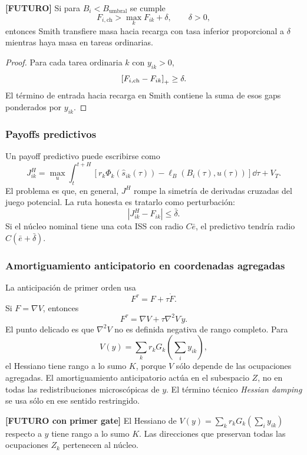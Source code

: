 \begin{lema} \textbf{[FUTURO]}
Si para $B_i<B_{\mathrm{umbral}}$ se cumple
\[
  F_{i,\mathrm{ch}}>\max_k F_{ik}+\delta,
  \qquad \delta>0,
\]
entonces Smith transfiere masa hacia recarga con tasa inferior proporcional a $\delta$
mientras haya masa en tareas ordinarias.
\end{lema}

\begin{proof}
Para cada tarea ordinaria $k$ con $y_{ik}>0$,
\[
  \left[F_{i,\mathrm{ch}}-F_{ik}\right]_{+}\ge\delta.
\]
El término de entrada hacia recarga en Smith contiene la suma de esos gaps ponderados
por $y_{ik}$.
\end{proof}

\subsubsection{Payoffs predictivos}

Un payoff predictivo puede escribirse como
\[
  J_{ik}^{H}
  =
  \max_u
  \int_t^{t+H}
  \left[
    r_k\Phi_k(\hat s_{ik}(\tau))-\ell_B(B_i(\tau),u(\tau))
  \right]\dd\tau
  +V_T.
\]
El problema es que, en general, $J^H$ rompe la simetría de derivadas cruzadas del juego
potencial. La ruta honesta es tratarlo como perturbación:
\[
  |J_{ik}^{H}-F_{ik}|\le\bar\delta.
\]
Si el núcleo nominal tiene una cota ISS con radio $C\bar e$, el predictivo tendría radio
$C(\bar e+\bar\delta)$.

\subsubsection{Amortiguamiento anticipatorio en coordenadas agregadas}

La anticipación de primer orden usa
\[
  F^\tau=F+\tau\dot F.
\]
Si $F=\nabla V$, entonces
\[
  F^\tau=\nabla V+\tau\nabla^2V\,\dot y.
\]
El punto delicado es que $\nabla^2V$ no es definida negativa de rango completo. Para
\[
  V(y)=\sum_k r_kG_k\left(\sum_i y_{ik}\right),
\]
el Hessiano tiene rango a lo sumo $K$, porque $V$ sólo depende de las ocupaciones
agregadas. El amortiguamiento anticipatorio actúa en el subespacio $Z$, no en todas las
redistribuciones microscópicas de $y$. El término técnico \emph{Hessian damping} se usa
sólo en ese sentido restringido.

\begin{lema} \textbf{[FUTURO con primer gate]}
El Hessiano de $V(y)=\sum_k r_kG_k(\sum_i y_{ik})$ respecto a $y$ tiene rango a lo sumo
$K$. Las direcciones que preservan todas las ocupaciones $Z_k$ pertenecen al núcleo.
\end{lema}

